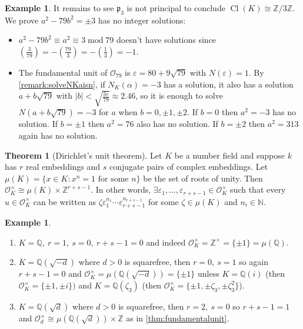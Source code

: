 \documentclass{article}
\newcommand{\N}{\mathbb{N}}
\newcommand{\Z}{\mathbb{Z}}
\newcommand{\Q}{\mathbb{Q}}
\newcommand{\Mod}{\operatorname{mod}}
\newcommand{\Cl}{\operatorname{Cl}}
\newcommand{\ri}{\mathcal{O}}
\newcommand{\ip}{\mathfrak{p}}
\theoremstyle{definition}
\newtheorem{thm}[defn]{Theorem}
\newtheorem{example}[defn]{Example}
\begin{document}
\begin{example}
It remains to see $\ip_3$ is not principal to conclude $\Cl(K)\cong\Z/3\Z$. We prove $a^2-79b^2=\pm 3$ has no integer solutions:
\begin{itemize}
\item $a^2-79b^2\equiv a^2\equiv 3\Mod 79$ doesn't have solutions since $\left(\frac{3}{79}\right)=-\left(\frac{79}{3}\right)=-\left(\frac{1}{3}\right)=-1$.
\item The fundamental unit of $\ri_{79}$ is $\varepsilon=80+9\sqrt{79}$ with $N(\varepsilon)=1$. By \ref{remark:solveNKaisn}, if $N_K(\alpha)=-3$ has a solution, it also has a solution $a+b\sqrt{79}$ with $|b|<\sqrt{\frac{3\varepsilon}{79}}\approx 2.46$, so it is enough to solve $N\left(a+b\sqrt{79}\right)=-3$ for $a$ when $b=0,\pm 1,\pm 2.$ If $b=0$ then $a^2=-3$ has no solution. If $b=\pm 1$ then $a^2=76$ also has no solution. If $b=\pm 2$ then $a^2=313$ again has no solution.
\end{itemize}
\end{example}

\begin{thm}[Dirichlet's unit theorem]
Let $K$ be a number field and suppose $k$ has $r$ real embeddings and $s$ conjugate pairs of complex embeddings. Let $\mu(K)=\{x\in K:x^n=1\text{ for some }n\}$ be the set of roots of unity. Then $\ri_K^\times\cong\mu(K)\times\Z^{r+s-1}$. In other words, $\exists \varepsilon_1,\ldots,\varepsilon_{r+s-1}\in\ri_K^\times$ such that every $u\in\ri_K^\times$ can be written as $\zeta\varepsilon_1^{n_1}\cdots\varepsilon_{r+s-1}^{n_{r+s-1}}$ for some $\zeta\in\mu(K)$ and $n_i\in\N$.
\end{thm}

\begin{example}
\begin{enumerate}
\item $K=\Q,\ r=1,\ s=0,\ r+s-1=0$ and indeed $\ri_K^\times=\Z^\times=\{\pm 1\}=\mu(\Q)$.
\item $K=\Q\left(\sqrt{-d}\right)$ where $d>0$ is squarefree, then $r=0,\ s=1$ so again $r+s-1=0$ and $\ri_K^\times=\mu\left(\Q\left(\sqrt{-d}\right)\right)=\{\pm 1\}$ unless $K=\Q(i)$ (then $\ri_K^\times=\{\pm 1,\pm i\})$ and $K=\Q(\zeta_3)$ (then $\ri_K^\times=\{\pm 1,\pm\zeta_3,\pm\zeta_3^2\}$).
\item $K=\Q\left(\sqrt d\right)$ where $d>0$ is squarefree, then $r=2,\ s=0$ so $r+s-1=1$ and $\ri_d^\times\cong\mu\left(\Q\left(\sqrt d\right)\right)\times\Z$ as in \ref{thm:fundamentalunit}.
\end{enumerate}
\end{example}
\end{document}
